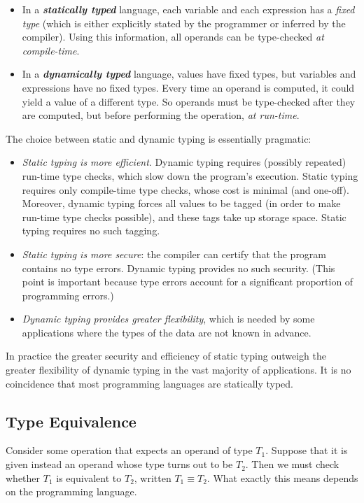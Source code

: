 \documentclass{article}
\begin{document}
\begin{itemize}
    \item In a \textbf{\textit{statically typed}} language, each variable and each expression has a \textit{fixed type} (which is either explicitly stated by the programmer or inferred by the compiler). Using this information, all operands can be type-checked \textit{at compile-time}.
    \item In a \textbf{\textit{dynamically typed}} language, values have fixed types, but variables and expressions have no fixed types. Every time an operand is computed, it could yield a value of a different type. So operands must be type-checked after they are computed, but before performing the operation, \textit{at run-time}.
\end{itemize}

The choice between static and dynamic typing is essentially pragmatic:
\begin{itemize}
    \item \textit{Static typing is more efficient}. Dynamic typing requires (possibly repeated) run-time type checks, which slow down the program’s execution. Static typing requires only compile-time type checks, whose cost is minimal (and one-off). Moreover, dynamic typing forces all values to be tagged (in order to make run-time type checks possible), and these tags take up storage space. Static typing requires no such tagging.
    \item \textit{Static typing is more secure}: the compiler can certify that the program contains no type errors. Dynamic typing provides no such security. (This point is important because type errors account for a significant proportion of programming errors.)
    \item \textit{Dynamic typing provides greater flexibility}, which is needed by some applications where the types of the data are not known in advance.
\end{itemize}

In practice the greater security and efficiency of static typing outweigh the
greater flexibility of dynamic typing in the vast majority of applications. It is no coincidence that most programming languages are statically typed.

\subsection{Type Equivalence}

Consider some operation that expects an operand of type $T_1$. Suppose that it is given instead an operand whose type turns out to be $T_2$. Then we must check whether $T_1$ is equivalent to $T_2$, written $T_1 \equiv T_2$. What exactly this means depends on the programming language.
\end{document}
